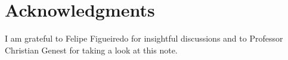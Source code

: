 \documentclass[a4paper, notitlepage, 10pt]{article}
\begin{document}
\section*{Acknowledgments}
I am grateful to Felipe Figueiredo for insightful discussions and to Professor Christian Genest for taking a look at this note.


\end{document}
